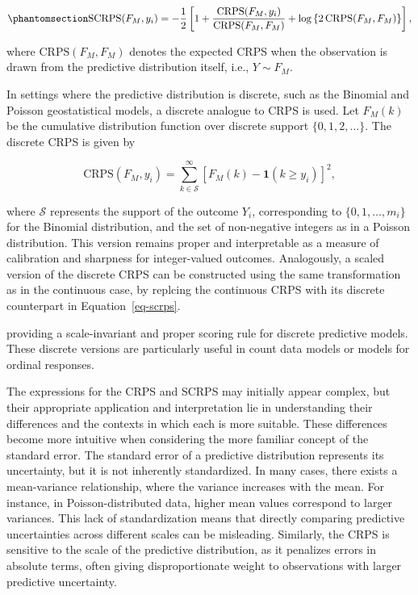 \documentclass[
  letterpaper,
]{krantz}
\begin{document}
\begin{equation}\phantomsection\label{eq-scrps}{
\text{SCRPS}(F_M, y_i) = -\frac{1}{2} \left[ 1 + \frac{\text{CRPS}(F_M, y_i)}{\text{CRPS}(F_M, F_M)} + \log\left\{2 \, \text{CRPS}(F_M, F_M)\right\} \right],
}\end{equation}

where \(\text{CRPS}(F_M, F_M)\) denotes the expected CRPS when the
observation is drawn from the predictive distribution itself, i.e.,
\(Y \sim F_M\).

In settings where the predictive distribution is discrete, such as the
Binomial and Poisson geostatistical models, a discrete analogue to CRPS
is used. Let \(F_M(k)\) be the cumulative distribution function over
discrete support \(\{0, 1, 2, \dots\}\). The discrete CRPS is given by

\[
\text{CRPS}(F_M, y_i) = \sum_{k \in \mathcal{S}}^{\infty} \left[ F_M(k) - \mathbf{1}(k \geq y_i) \right]^2,
\]

where \(\mathcal{S}\) represents the support of the outcome \(Y_{i}\),
corresponding to \(\{0,1,\ldots,m_i\}\) for the Binomial distribution,
and the set of non-negative integers as in a Poisson distribution. This
version remains proper and interpretable as a measure of calibration and
sharpness for integer-valued outcomes. Analogously, a scaled version of
the discrete CRPS can be constructed using the same transformation as in
the continuous case, by replcing the continuous CRPS with its discrete
counterpart in Equation~\ref{eq-scrps}.

providing a scale-invariant and proper scoring rule for discrete
predictive models. These discrete versions are particularly useful in
count data models or models for ordinal responses.

The expressions for the CRPS and SCRPS may initially appear complex, but
their appropriate application and interpretation lie in understanding
their differences and the contexts in which each is more suitable. These
differences become more intuitive when considering the more familiar
concept of the standard error. The standard error of a predictive
distribution represents its uncertainty, but it is not inherently
standardized. In many cases, there exists a mean-variance relationship,
where the variance increases with the mean. For instance, in
Poisson-distributed data, higher mean values correspond to larger
variances. This lack of standardization means that directly comparing
predictive uncertainties across different scales can be misleading.
Similarly, the CRPS is sensitive to the scale of the predictive
distribution, as it penalizes errors in absolute terms, often giving
disproportionate weight to observations with larger predictive
uncertainty.
\end{document}
